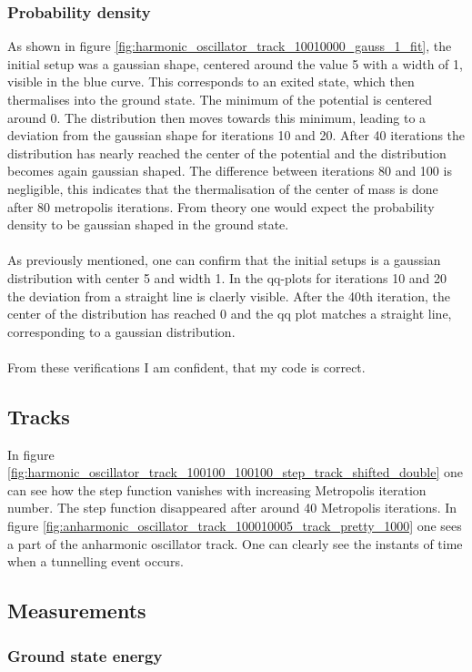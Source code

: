 \documentclass{scrartcl}
\begin{document}
	\subsubsection{Probability density}
		As shown in figure \ref{fig:harmonic_oscillator_track_10010000_gauss_1_fit}, the initial setup was a gaussian shape, centered around the value 5 with a width of 1, visible in the blue curve.
		This corresponds to an exited state, which then thermalises into the ground state.
		The minimum of the potential is centered around 0.
		The distribution then moves towards this minimum, leading to a deviation from the gaussian shape for iterations 10 and 20.
		After 40 iterations the distribution has nearly reached the center of the potential and the distribution becomes again gaussian shaped.
		The difference between iterations 80 and 100 is negligible, this indicates that the thermalisation of the center of mass is done after 80 metropolis iterations.
		From theory one would expect the probability density to be gaussian shaped in the ground state.
		\\\\
		As previously mentioned, one can confirm that the initial setups is a gaussian distribution with center 5 and width 1.
		In the qq-plots for iterations 10 and 20 the deviation from a straight line is claerly visible.
		After the 40th iteration, the center of the distribution has reached 0 and the qq plot matches a straight line, corresponding to a gaussian distribution.
		\\\\
		From these verifications I am confident, that my code is correct.
	\subsection{Tracks}
		In figure \ref{fig:harmonic_oscillator_track_100100_100100_step_track_shifted_double} one can see how the step function vanishes with increasing Metropolis iteration number.
		The step function disappeared after around 40 Metropolis iterations.
		In figure \ref{fig:anharmonic_oscillator_track_100010005_track_pretty_1000} one sees a part of the anharmonic oscillator track.
		One can clearly see the instants of time when a tunnelling event occurs.
	\subsection{Measurements}
	\subsubsection{Ground state energy}
\end{document}
